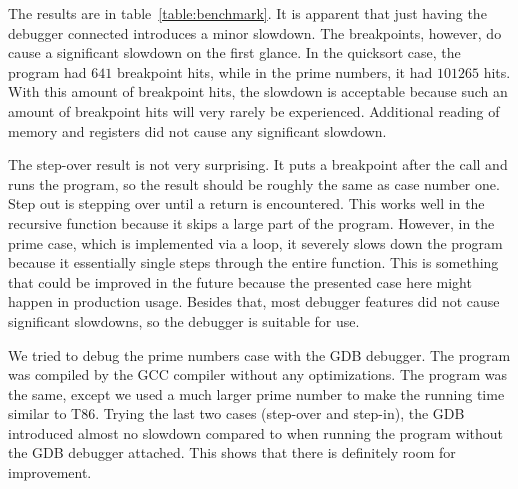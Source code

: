 The results are in table~\ref{table:benchmark}. It is apparent that just having
the debugger connected introduces a minor slowdown. The breakpoints, however,
do cause a significant slowdown on the first glance. In the quicksort case, the
program had $641$ breakpoint hits, while in the prime numbers, it had $101265$
hits. With this amount of breakpoint hits, the slowdown is acceptable because
such an amount of breakpoint hits will very rarely be experienced. Additional
reading of memory and registers did not cause any significant slowdown.

The step-over result is not very surprising. It puts a breakpoint after the
call and runs the program, so the result should be roughly the same as case
number one. Step out is stepping over until a return is encountered. This works
well in the recursive function because it skips a large part of the program.
However, in the prime case, which is implemented via a loop, it severely slows
down the program because it essentially single steps through the entire
function. This is something that could be improved in the future because the
presented case here might happen in production usage. Besides that, most
debugger features did not cause significant slowdowns, so the debugger is
suitable for use.

We tried to debug the prime numbers case with the GDB debugger. The program was
compiled by the GCC compiler without any optimizations. The program was the
same, except we used a much larger prime number to make the running time
similar to T86. Trying the last two cases (step-over and step-in), the GDB
introduced almost no slowdown compared to when running the program without the
GDB debugger attached. This shows that there is definitely room for
improvement.
